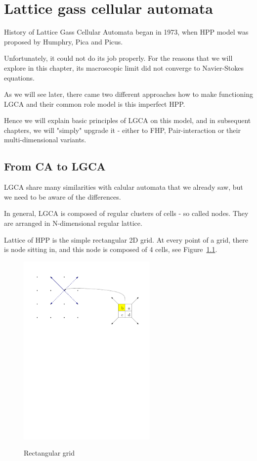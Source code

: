 \chapter{Lattice gass cellular automata}

History of Lattice Gass Cellular Automata began in 1973, when HPP model was proposed by Humphry, Pica and Picus.

Unfortunately, it could not do its job properly. For the reasons that we will explore in this chapter, its macroscopic limit did not converge to Navier-Stokes equations.

\bigskip

As we will see later, there came two different approaches how to make functioning LGCA and their common role model is this imperfect HPP.

Hence we will explain basic principles of LGCA on this model, and in subsequent chapters, we will "simply" upgrade it - either to FHP, Pair-interaction or their multi-dimensional variants.

\section{From CA to LGCA}

LGCA share many similarities with calular automata that we already saw,
but we need to be aware of the differences.

In general, LGCA is composed of regular clusters of cells - so called nodes. They are arranged in N-dimensional regular lattice.

Lattice of HPP is the simple rectangular 2D grid. At every point of a grid, there is node sitting in, and this node is composed of 4 cells, see Figure~\ref{rectangular}.

\begin{figure}[htbp]
 \centering
 \includegraphics[width=0.6\textwidth]{./img/hpp-desc}
 \label{rectangular}
 \caption{Rectangular grid}
\end{figure}


